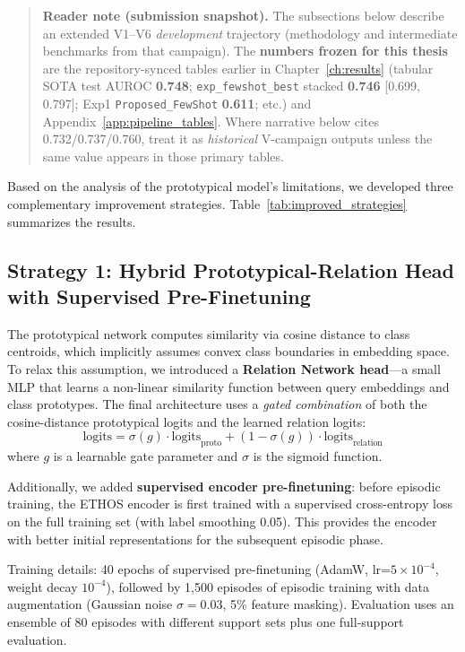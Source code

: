 \begin{quote}
\small
\textbf{Reader note (submission snapshot).} The subsections below describe an extended V1--V6 \emph{development} trajectory (methodology and intermediate benchmarks from that campaign). The \textbf{numbers frozen for this thesis} are the repository-synced tables earlier in Chapter~\ref{ch:results} (tabular SOTA test AUROC \textbf{0.748}; \texttt{exp\_fewshot\_best} stacked \textbf{0.746} [0.699, 0.797]; Exp1 \texttt{Proposed\_FewShot} \textbf{0.611}; etc.) and Appendix~\ref{app:pipeline_tables}. Where narrative below cites 0.732/0.737/0.760, treat it as \emph{historical} V-campaign outputs unless the same value appears in those primary tables.
\end{quote}

Based on the analysis of the prototypical model's limitations, we developed three complementary improvement strategies. Table~\ref{tab:improved_strategies} summarizes the results.

\subsection{Strategy 1: Hybrid Prototypical-Relation Head with Supervised Pre-Finetuning}

The prototypical network computes similarity via cosine distance to class centroids, which implicitly assumes convex class boundaries in embedding space. To relax this assumption, we introduced a \textbf{Relation Network head}---a small MLP that learns a non-linear similarity function between query embeddings and class prototypes. The final architecture uses a \textit{gated combination} of both the cosine-distance prototypical logits and the learned relation logits:
\begin{equation}
\text{logits} = \sigma(g) \cdot \text{logits}_{\text{proto}} + (1 - \sigma(g)) \cdot \text{logits}_{\text{relation}}
\end{equation}
where $g$ is a learnable gate parameter and $\sigma$ is the sigmoid function.

Additionally, we added \textbf{supervised encoder pre-finetuning}: before episodic training, the ETHOS encoder is first trained with a supervised cross-entropy loss on the full training set (with label smoothing 0.05). This provides the encoder with better initial representations for the subsequent episodic phase.

Training details: 40 epochs of supervised pre-finetuning (AdamW, lr=$5\times10^{-4}$, weight decay $10^{-4}$), followed by 1,500 episodes of episodic training with data augmentation (Gaussian noise $\sigma=0.03$, 5\% feature masking). Evaluation uses an ensemble of 80 episodes with different support sets plus one full-support evaluation.

